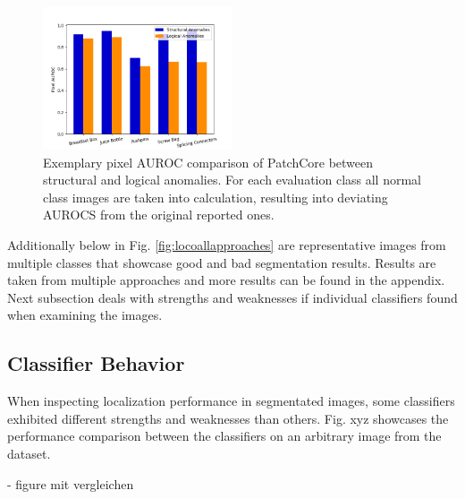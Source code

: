 \begin{figure}[H]
    \centering
    \includegraphics[width=0.5\textwidth]{figures/structvslogic.png}
    \caption{Exemplary pixel AUROC comparison of PatchCore \cite{patchCore2022} between structural and logical anomalies. For each evaluation class all normal class images 
             are taken into calculation, resulting into deviating AUROCS from the original reported ones.}
    \label{fig:structvslogic}
\end{figure}

Additionally below in Fig. \ref{fig:locoallapproaches} are representative images from multiple classes that showcase good and bad segmentation results. Results are taken from multiple approaches and 
more results can be found in the appendix. Next subsection deals with strengths and weaknesses if individual classifiers found when examining the images.

%
%




\subsection{Classifier Behavior}
\label{subsec:classifierbehavior}

When inspecting localization performance in segmentated images, some classifiers exhibited different strengths and weaknesses than others. Fig. xyz showcases 
the performance comparison between the classifiers on an arbitrary image from the dataset.

- figure mit vergleichen

